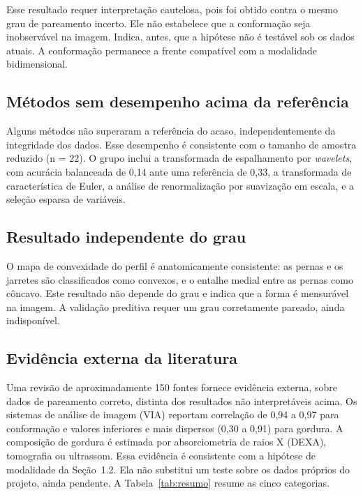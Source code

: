 \documentclass[12pt,a4paper]{article}
\begin{document}
Esse resultado requer interpretação cautelosa, pois foi obtido contra o mesmo grau de
pareamento incerto. Ele não estabelece que a conformação seja inobservável na imagem.
Indica, antes, que a hipótese não é testável sob os dados atuais. A conformação permanece
a frente compatível com a modalidade bidimensional.

\subsection{Métodos sem desempenho acima da referência}

Alguns métodos não superaram a referência do acaso, independentemente da integridade dos
dados. Esse desempenho é consistente com o tamanho de amostra reduzido (n = 22). O grupo
inclui a transformada de espalhamento por \emph{wavelets}, com acurácia balanceada de
0,14 ante uma referência de 0,33, a transformada de característica de Euler, a análise de
renormalização por suavização em escala, e a seleção esparsa de variáveis.

\subsection{Resultado independente do grau}

O mapa de convexidade do perfil é anatomicamente consistente: as pernas e os jarretes
são classificados como convexos, e o entalhe medial entre as pernas como côncavo. Este
resultado não depende do grau e indica que a forma é mensurável na imagem. A validação
preditiva requer um grau corretamente pareado, ainda indisponível.

\subsection{Evidência externa da literatura}\label{sec:lit}

Uma revisão de aproximadamente 150 fontes fornece evidência externa, sobre dados de
pareamento correto, distinta dos resultados não interpretáveis acima. Os sistemas de
análise de imagem (VIA) reportam correlação de 0,94 a 0,97 para conformação e valores
inferiores e mais dispersos (0,30 a 0,91) para gordura. A composição de gordura é
estimada por absorciometria de raios X (DEXA), tomografia ou ultrassom. Essa evidência
é consistente com a hipótese de modalidade da Seção~1.2. Ela não substitui um teste
sobre os dados próprios do projeto, ainda pendente. A Tabela~\ref{tab:resumo} resume as
cinco categorias.
\end{document}
